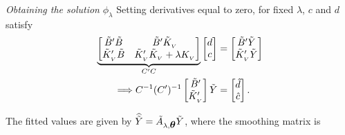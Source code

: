 \begin{frame}{\textit{Obtaining the solution}  $\phi_\lambda$}
\footnotesize
Setting derivatives equal to zero, for fixed $\lambda$, $c$ and $d$ satisfy
\begin{align*}%
\underbrace{\begin{bmatrix}
\tildeB'\tildeB & \tildeB'\tildeK_{_{ V}} \\
\tildeK_{_{ V}}'\tildeB & \tildeK_{_{ V}}'\tildeK_{_{ V}} + \lambda K_{_{ V}}\\
\end{bmatrix}}_{C'C}
\begin{bmatrix}
d\\
c\\
\end{bmatrix}
&= \begin{bmatrix}
\tildeB'\tildeY \\
 \tildeK_{_{ V}}'\tildeY\\
\end{bmatrix}\\
\Longrightarrow  {C}^{-1} ({C}')^{-1} \begin{bmatrix} \tildeB' \\ \tildeK_{_{ V}}' \end{bmatrix} \tildeY&=  \begin{bmatrix} \hat{d} \\ \hat{c} \end{bmatrix} . 
\end{align*}

The fitted values are given by $\widehat{\tilde{Y}} =  \tilde{A}_{\lambda,\mbox{\boldmath $\theta$}} \tilde{Y}$, where the smoothing matrix is

\end{frame}



